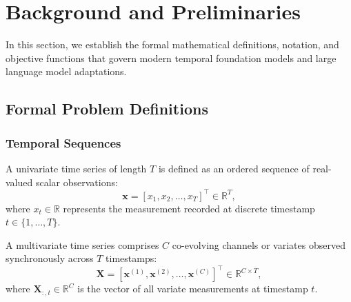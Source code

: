 \section{Background and Preliminaries}
\label{sec:prelim}

In this section, we establish the formal mathematical definitions, notation, and objective functions that govern modern temporal foundation models and large language model adaptations.

\subsection{Formal Problem Definitions}

\subsubsection{Temporal Sequences}
A univariate time series of length $T$ is defined as an ordered sequence of real-valued scalar observations:
\begin{equation}
    \mathbf{x} = [x_1, x_2, \dots, x_T]^\top \in \mathbb{R}^T,
\end{equation}
where $x_t \in \mathbb{R}$ represents the measurement recorded at discrete timestamp $t \in \{1, \dots, T\}$.

A multivariate time series comprises $C$ co-evolving channels or variates observed synchronously across $T$ timestamps:
\begin{equation}
    \mathbf{X} = [\mathbf{x}^{(1)}, \mathbf{x}^{(2)}, \dots, \mathbf{x}^{(C)}]^\top \in \mathbb{R}^{C \times T},
\end{equation}
where $\mathbf{X}_{:, t} \in \mathbb{R}^C$ is the vector of all variate measurements at timestamp $t$.

